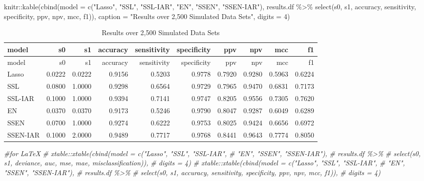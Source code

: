 \documentclass[
]{article}
\newenvironment{Shaded}{\begin{snugshade}}{\end{snugshade}}
\newcommand{\AttributeTok}[1]{\textcolor[rgb]{0.77,0.63,0.00}{#1}}
\newcommand{\CommentTok}[1]{\textcolor[rgb]{0.56,0.35,0.01}{\textit{#1}}}
\newcommand{\DecValTok}[1]{\textcolor[rgb]{0.00,0.00,0.81}{#1}}
\newcommand{\FunctionTok}[1]{\textcolor[rgb]{0.00,0.00,0.00}{#1}}
\newcommand{\NormalTok}[1]{#1}
\newcommand{\SpecialCharTok}[1]{\textcolor[rgb]{0.00,0.00,0.00}{#1}}
\newcommand{\StringTok}[1]{\textcolor[rgb]{0.31,0.60,0.02}{#1}}
\begin{document}
\begin{Shaded}
\begin{Highlighting}[]
\NormalTok{knitr}\SpecialCharTok{::}\FunctionTok{kable}\NormalTok{(}\FunctionTok{cbind}\NormalTok{(}\AttributeTok{model =} \FunctionTok{c}\NormalTok{(}\StringTok{"Lasso"}\NormalTok{, }\StringTok{"SSL"}\NormalTok{, }\StringTok{"SSL{-}IAR"}\NormalTok{,}
                             \StringTok{"EN"}\NormalTok{, }\StringTok{"SSEN"}\NormalTok{, }\StringTok{"SSEN{-}IAR"}\NormalTok{), }
\NormalTok{                   results.df }\SpecialCharTok{\%\textgreater{}\%} 
                     \FunctionTok{select}\NormalTok{(s0, s1, accuracy, sensitivity, specificity, ppv, npv, mcc, f1)),}
             \AttributeTok{caption =} \StringTok{"Results over 2,500 Simulated Data Sets"}\NormalTok{,}
             \AttributeTok{digits =} \DecValTok{4}\NormalTok{)}
\end{Highlighting}
\end{Shaded}

\begin{longtable}[]{@{}lrrrrrrrrr@{}}
\caption{Results over 2,500 Simulated Data Sets}\tabularnewline
\toprule
model & s0 & s1 & accuracy & sensitivity & specificity & ppv & npv & mcc
& f1 \\
\midrule
\endfirsthead
\toprule
model & s0 & s1 & accuracy & sensitivity & specificity & ppv & npv & mcc
& f1 \\
\midrule
\endhead
Lasso & 0.0222 & 0.0222 & 0.9156 & 0.5203 & 0.9778 & 0.7920 & 0.9280 &
0.5963 & 0.6224 \\
SSL & 0.0800 & 1.0000 & 0.9298 & 0.6564 & 0.9729 & 0.7965 & 0.9470 &
0.6831 & 0.7173 \\
SSL-IAR & 0.1000 & 1.0000 & 0.9394 & 0.7141 & 0.9747 & 0.8205 & 0.9556 &
0.7305 & 0.7620 \\
EN & 0.0370 & 0.0370 & 0.9173 & 0.5246 & 0.9790 & 0.8047 & 0.9287 &
0.6049 & 0.6289 \\
SSEN & 0.0700 & 1.0000 & 0.9274 & 0.6222 & 0.9753 & 0.8025 & 0.9424 &
0.6656 & 0.6972 \\
SSEN-IAR & 0.1000 & 2.0000 & 0.9489 & 0.7717 & 0.9768 & 0.8441 & 0.9643
& 0.7774 & 0.8050 \\
\bottomrule
\end{longtable}

\begin{Shaded}
\begin{Highlighting}[]
\CommentTok{\#for LaTeX}
\CommentTok{\# xtable::xtable(cbind(model = c("Lasso", "SSL", "SSL{-}IAR",}
\CommentTok{\#                              "EN", "SSEN", "SSEN{-}IAR"),}
\CommentTok{\#                    results.df \%\textgreater{}\%}
\CommentTok{\#                      select(s0, s1, deviance, auc, mse, mae, misclassification)),}
\CommentTok{\#                digits = 4)}
\CommentTok{\# xtable::xtable(cbind(model = c("Lasso", "SSL", "SSL{-}IAR",}
\CommentTok{\#                              "EN", "SSEN", "SSEN{-}IAR"),}
\CommentTok{\#                    results.df \%\textgreater{}\%}
\CommentTok{\#                      select(s0, s1, accuracy, sensitivity, specificity, ppv, npv, mcc, f1)),}
\CommentTok{\#                digits = 4)}
\end{Highlighting}
\end{Shaded}
\end{document}
